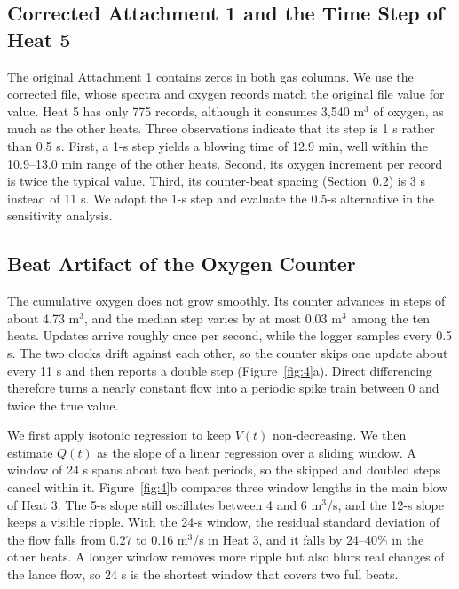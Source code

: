 \subsection[Attachment 1 and the Heat 5 Time Step]{Corrected Attachment 1 and the Time Step of Heat 5}\label{sec:3.2}

The original Attachment 1 contains zeros in both gas columns. We use the corrected file, whose spectra and oxygen records match the original file value for value. Heat 5 has only 775 records, although it consumes 3,540 m\ensuremath{^{3}} of oxygen, as much as the other heats. Three observations indicate that its step is 1 s rather than 0.5 s. First, a 1-s step yields a blowing time of 12.9 min, well within the 10.9–13.0 min range of the other heats. Second, its oxygen increment per record is twice the typical value. Third, its counter-beat spacing (Section~\ref{sec:3.3}) is 3 s instead of 11 s. We adopt the 1-s step and evaluate the 0.5-s alternative in the sensitivity analysis.

\subsection{Beat Artifact of the Oxygen Counter}\label{sec:3.3}

The cumulative oxygen does not grow smoothly. Its counter advances in steps of about 4.73 m\ensuremath{^{3}}, and the median step varies by at most 0.03 m\ensuremath{^{3}} among the ten heats. Updates arrive roughly once per second, while the logger samples every 0.5 s. The two clocks drift against each other, so the counter skips one update about every 11 s and then reports a double step (Figure~\ref{fig:4}a). Direct differencing therefore turns a nearly constant flow into a periodic spike train between 0 and twice the true value.

We first apply isotonic regression to keep $V(t)$ non-decreasing. We then estimate $Q(t)$ as the slope of a linear regression over a sliding window. A window of 24 s spans about two beat periods, so the skipped and doubled steps cancel within it. Figure~\ref{fig:4}b compares three window lengths in the main blow of Heat 3. The 5-s slope still oscillates between 4 and 6 m\ensuremath{^{3}}/s, and the 12-s slope keeps a visible ripple. With the 24-s window, the residual standard deviation of the flow falls from 0.27 to 0.16 m\ensuremath{^{3}}/s in Heat 3, and it falls by 24–40\% in the other heats. A longer window removes more ripple but also blurs real changes of the lance flow, so 24 s is the shortest window that covers two full beats.

